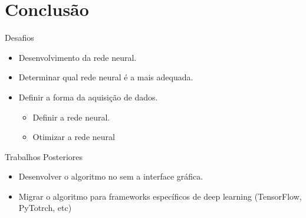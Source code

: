 \section{Conclusão}

\begin{frame}{Desafios}
\begin{itemize}
    \item Desenvolvimento da rede neural.
    \item Determinar qual rede neural é a mais adequada.
    \item Definir a forma da aquisição de dados.
    \begin{itemize}
        \item Definir a rede neural.
        \item Otimizar a rede neural
    \end{itemize}
\end{itemize}

\begin{block}{Trabalhos Posteriores}
    \begin{itemize}
        \item Desenvolver o algoritmo no \matlab sem a interface gráfica.
        \item Migrar o algoritmo para frameworks específicos de deep learning (TensorFlow, PyTotrch, etc)
    \end{itemize}
\end{block}
\end{frame}